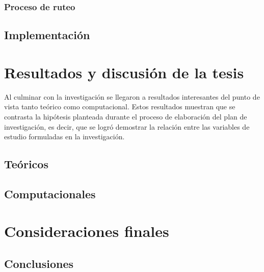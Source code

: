 \subsection{Proceso de ruteo}

\section{Implementación} 
























\chapter{Resultados y discusión de la tesis}


Al culminar con la investigación se llegaron a resultados interesantes del punto de vista tanto teórico como computacional. Estos resultados muestran que se contrasta la hipótesis planteada durante el proceso de elaboración del plan de investigación, es decir, que se logró demostrar la relación entre las variables de estudio formuladas en la investigación.

\section{Teóricos}

\section{Computacionales}




\chapter{Consideraciones finales}


\section{Conclusiones}

